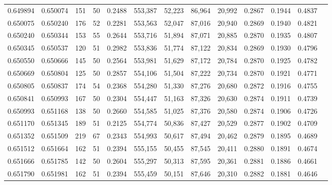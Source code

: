 \begin{tabular}{rrrrrrrrrrrrr}
0.649894 & 0.650074 &   151 &  50 &                                     0.2488 & 553,387 &  52,223 &  86,964 &  20,992 & 0.2867 & 0.1944 & 0.4837 \\
0.650075 & 0.650240 &   176 &  52 &                                     0.2281 & 553,563 &  52,047 &  87,016 &  20,940 & 0.2869 & 0.1940 & 0.4821 \\
0.650240 & 0.650344 &   153 &  55 &                                     0.2644 & 553,716 &  51,894 &  87,071 &  20,885 & 0.2870 & 0.1935 & 0.4807 \\
0.650345 & 0.650537 &   120 &  51 &                                     0.2982 & 553,836 &  51,774 &  87,122 &  20,834 & 0.2869 & 0.1930 & 0.4796 \\
0.650550 & 0.650666 &   145 &  50 &                                     0.2564 & 553,981 &  51,629 &  87,172 &  20,784 & 0.2870 & 0.1925 & 0.4782 \\
0.650669 & 0.650804 &   125 &  50 &                                     0.2857 & 554,106 &  51,504 &  87,222 &  20,734 & 0.2870 & 0.1921 & 0.4771 \\
0.650805 & 0.650837 &   174 &  54 &                                     0.2368 & 554,280 &  51,330 &  87,276 &  20,680 & 0.2872 & 0.1916 & 0.4755 \\
0.650841 & 0.650993 &   167 &  50 &                                     0.2304 & 554,447 &  51,163 &  87,326 &  20,630 & 0.2874 & 0.1911 & 0.4739 \\
0.650993 & 0.651168 &   138 &  50 &                                     0.2660 & 554,585 &  51,025 &  87,376 &  20,580 & 0.2874 & 0.1906 & 0.4726 \\
0.651170 & 0.651345 &   189 &  51 &                                     0.2125 & 554,774 &  50,836 &  87,427 &  20,529 & 0.2877 & 0.1902 & 0.4709 \\
0.651352 & 0.651509 &   219 &  67 &                                     0.2343 & 554,993 &  50,617 &  87,494 &  20,462 & 0.2879 & 0.1895 & 0.4689 \\
0.651512 & 0.651664 &   162 &  51 &                                     0.2394 & 555,155 &  50,455 &  87,545 &  20,411 & 0.2880 & 0.1891 & 0.4674 \\
0.651666 & 0.651785 &   142 &  50 &                                     0.2604 & 555,297 &  50,313 &  87,595 &  20,361 & 0.2881 & 0.1886 & 0.4661 \\
0.651790 & 0.651981 &   162 &  51 &                                     0.2394 & 555,459 &  50,151 &  87,646 &  20,310 & 0.2882 & 0.1881 & 0.4646 \\

\end{tabular}
